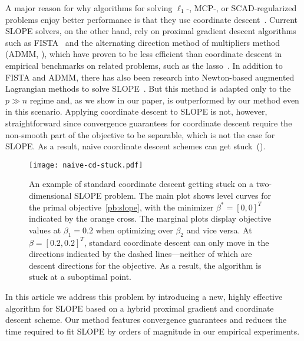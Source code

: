 A major reason for why algorithms for solving
$\ell_1$-, MCP-, or SCAD-regularized problems enjoy better performance is that
they use coordinate
descent~\parencite{tseng2001convergence,friedman2010,breheny2011}. Current SLOPE
solvers, on the other hand, rely on proximal gradient descent algorithms such
as FISTA~\parencite{beck2009} and the alternating direction method of multipliers
method (ADMM, \cite{boyd2010}), which have proven to be less efficient than
coordinate descent in empirical benchmarks on related problems, such as the
lasso~\parencite{moreau2022benchopt}.
In addition to FISTA and ADMM, there has also been research into Newton-based augmented Lagrangian methods to solve SLOPE~\parencite{Ziyan2019}.
But this method is adapted only to the \(p \gg n\) regime and, as we show in our paper, is outperformed by our method even in this scenario.
Applying coordinate descent to SLOPE is not,
however, straightforward since convergence guarantees for coordinate descent
require the non-smooth part of the objective to be separable, which is not the case for SLOPE. As a
result, naive coordinate descent schemes can get
stuck~().

\begin{figure}[htb]
  \centering
  \texttt{[image: naive-cd-stuck.pdf]}
  \caption{%
  An example of standard coordinate descent getting stuck on a two-dimensional SLOPE problem.
  The main plot shows level curves for the primal objective~\eqref{pb:slope}, with the minimizer \(\beta^* = [0, 0]^T\) indicated by the orange cross.
  The marginal plots display objective values at \(\beta_1 = 0.2\) when optimizing over \(\beta_2\) and vice versa.
  At \(\beta = [0.2,0.2]^T\), standard coordinate descent can only move in the directions indicated by the dashed lines---neither of which are descent directions for the objective.
  As a result, the algorithm is stuck at a suboptimal point.
  }
  \label{fig:naive-cd-stuck}
\end{figure}

In this article we address this problem by introducing a new, highly effective
algorithm for SLOPE based on a hybrid proximal gradient and coordinate descent
scheme. Our method features convergence guarantees and reduces the time
required to fit SLOPE by orders of magnitude in our empirical experiments.


